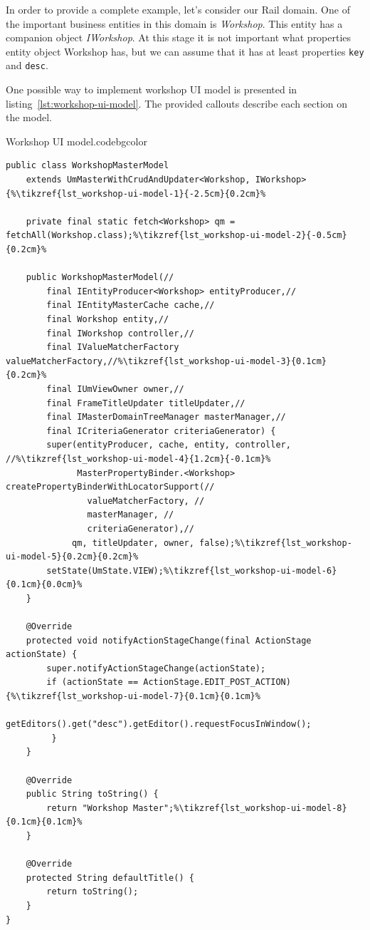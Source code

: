   In order to provide a complete example, let's consider our Rail domain.
  One of the important business entities in this domain is \emph{Workshop}.
  This entity has a companion object \emph{IWorkshop}.
  At this stage it is not important what properties entity object Workshop has, but we can assume that it has at least properties \texttt{key} and \texttt{desc}.
  
  One possible way to implement workshop UI model is presented in listing~\ref{lst:workshop-ui-model}.
  The provided callouts describe each section on the model.
  
  
  \begin{code}{Workshop UI model.}{\label{lst:workshop-ui-model}}{codebgcolor}
    \begin{lstlisting}
public class WorkshopMasterModel 
    extends UmMasterWithCrudAndUpdater<Workshop, IWorkshop> {%\tikzref{lst_workshop-ui-model-1}{-2.5cm}{0.2cm}%

    private final static fetch<Workshop> qm = fetchAll(Workshop.class);%\tikzref{lst_workshop-ui-model-2}{-0.5cm}{0.2cm}%
    
    public WorkshopMasterModel(//
    	final IEntityProducer<Workshop> entityProducer,//
    	final IEntityMasterCache cache,//
    	final Workshop entity,//
    	final IWorkshop controller,//
    	final IValueMatcherFactory valueMatcherFactory,//%\tikzref{lst_workshop-ui-model-3}{0.1cm}{0.2cm}%
    	final IUmViewOwner owner,//
    	final FrameTitleUpdater titleUpdater,//
    	final IMasterDomainTreeManager masterManager,//
    	final ICriteriaGenerator criteriaGenerator) {
        super(entityProducer, cache, entity, controller, //%\tikzref{lst_workshop-ui-model-4}{1.2cm}{-0.1cm}%
              MasterPropertyBinder.<Workshop> createPropertyBinderWithLocatorSupport(//
     			valueMatcherFactory, //
     			masterManager, //
     			criteriaGenerator),//
     	     qm, titleUpdater, owner, false);%\tikzref{lst_workshop-ui-model-5}{0.2cm}{0.2cm}%
        setState(UmState.VIEW);%\tikzref{lst_workshop-ui-model-6}{0.1cm}{0.0cm}%
    }
     
    @Override
    protected void notifyActionStageChange(final ActionStage actionState) {
        super.notifyActionStageChange(actionState);
        if (actionState == ActionStage.EDIT_POST_ACTION) {%\tikzref{lst_workshop-ui-model-7}{0.1cm}{0.1cm}%            
            getEditors().get("desc").getEditor().requestFocusInWindow();
         }
    }
     
    @Override
    public String toString() {
        return "Workshop Master";%\tikzref{lst_workshop-ui-model-8}{0.1cm}{0.1cm}%            
    }
     
    @Override
    protected String defaultTitle() {
        return toString();
    }
}
    \end{lstlisting}
  \end{code}
